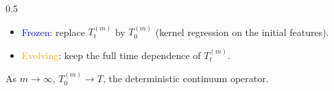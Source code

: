 \documentclass[aspectratio=169,9pt]{beamer}
\begin{document}
\begin{frame}[noframenumbering]
\begin{columns}[T,onlytextwidth]
\begin{column}{0.5\textwidth}
\begin{bluecard}[height=44mm]
				\begin{itemize}\tightlist\scriptsize
					\item \textcolor{blue}{Frozen}: replace $T_t^{(m)}$ by $T_0^{(m)}$ (kernel regression on the initial features).
					\item \textcolor{orange}{Evolving}: keep the full time dependence of $T_t^{(m)}$.
				\end{itemize}
				\vspace{0.5mm}
				{\tiny\textcolor{muted}{As $m\to\infty$, $T_0^{(m)}\to T$, the deterministic continuum operator.}}
			\end{bluecard}
		\end{column}
	\end{columns}
\end{frame}

\end{document}
